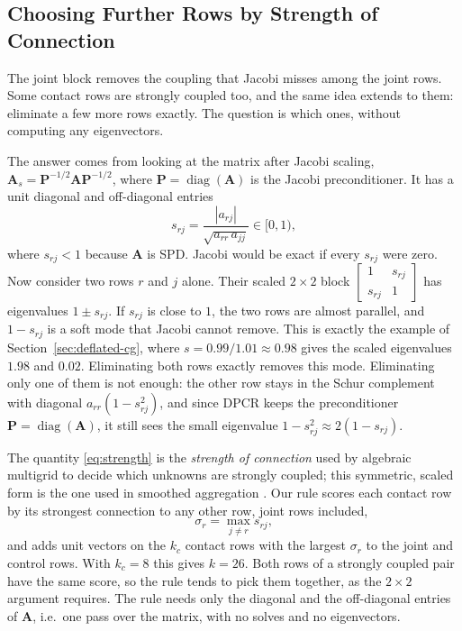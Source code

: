 \subsection{Choosing Further Rows by Strength of Connection}
\label{sec:z-strength}

The joint block removes the coupling that Jacobi misses among the joint
rows. Some contact rows are strongly coupled too, and the same idea extends
to them: eliminate a few more rows exactly. The question is which ones,
without computing any eigenvectors.

The answer comes from looking at the matrix after Jacobi scaling,
$\mathbf{A}_s = \mathbf{P}^{-1/2}\mathbf{A}\mathbf{P}^{-1/2}$, where
$\mathbf{P} = \operatorname{diag}(\mathbf{A})$ is the Jacobi preconditioner. It has a unit diagonal and
off-diagonal entries
\begin{equation}
  s_{rj} = \frac{|a_{rj}|}{\sqrt{a_{rr}\,a_{jj}}} \in [0, 1),
  \label{eq:strength}
\end{equation}
where $s_{rj} < 1$ because $\mathbf{A}$ is SPD. Jacobi would be exact if every
$s_{rj}$ were zero. Now consider two rows $r$ and $j$ alone. Their scaled
$2 \times 2$ block $\begin{bmatrix} 1 & s_{rj} \\ s_{rj} & 1 \end{bmatrix}$
has eigenvalues $1 \pm s_{rj}$. If $s_{rj}$ is close to $1$, the two rows
are almost parallel, and $1 - s_{rj}$ is a soft mode that Jacobi cannot
remove. This is exactly the example of Section~\ref{sec:deflated-cg}, where
$s = 0.99/1.01 \approx 0.98$ gives the scaled eigenvalues $1.98$ and $0.02$.
Eliminating both rows exactly removes this mode. Eliminating only one of them
is not enough: the other row stays in the Schur complement with diagonal
$a_{rr}(1 - s_{rj}^2)$, and since DPCR keeps the preconditioner
$\mathbf{P} = \operatorname{diag}(\mathbf{A})$, it still sees the small
eigenvalue $1 - s_{rj}^2 \approx 2(1 - s_{rj})$.

The quantity \eqref{eq:strength} is the \emph{strength of connection} used
by algebraic multigrid to decide which unknowns are strongly coupled; this
symmetric, scaled form is the one used in smoothed aggregation
\citep{vanek1996algebraic}. Our rule scores each contact row by its strongest
connection to any other row, joint rows included,
\begin{equation}
  \sigma_r = \max_{j \ne r} s_{rj},
\end{equation}
and adds unit vectors on the $k_c$ contact rows with the largest $\sigma_r$
to the joint and control rows. With $k_c = 8$ this gives $k = 26$. Both
rows of a strongly coupled pair have the same score, so the rule tends to
pick them together, as the $2 \times 2$ argument requires. The
rule needs only the diagonal and the off-diagonal entries of $\mathbf{A}$,
i.e.\ one pass over the matrix, with no solves and no eigenvectors.

